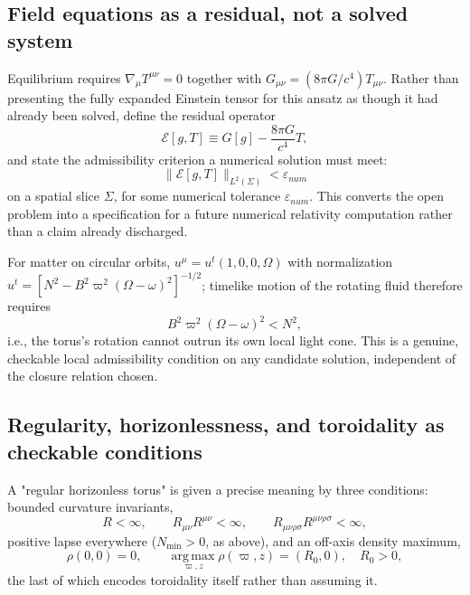 \documentclass[11pt]{article}
\begin{document}
\subsection{Field equations as a residual, not a solved system}

Equilibrium requires $\nabla_\mu T^{\mu\nu}=0$ together with $G_{\mu\nu} = (8\pi G/c^4)T_{\mu\nu}$. Rather than presenting the fully expanded Einstein tensor for this ansatz as though it had already been solved, define the residual operator
\begin{equation}
\mathcal{E}[g,T] \equiv G[g] - \frac{8\pi G}{c^4}T,
\end{equation}
and state the admissibility criterion a numerical solution must meet:
\begin{equation}
\|\mathcal{E}[g,T]\|_{L^2(\Sigma)} < \varepsilon_{num}
\end{equation}
on a spatial slice $\Sigma$, for some numerical tolerance $\varepsilon_{num}$. This converts the open problem into a specification for a future numerical relativity computation rather than a claim already discharged.

For matter on circular orbits, $u^\mu = u^t(1,0,0,\Omega)$ with normalization $u^t = \left[N^2 - B^2\varpi^2(\Omega-\omega)^2\right]^{-1/2}$; timelike motion of the rotating fluid therefore requires
\begin{equation}
B^2\varpi^2(\Omega-\omega)^2 < N^2,
\end{equation}
i.e., the torus's rotation cannot outrun its own local light cone. This is a genuine, checkable local admissibility condition on any candidate solution, independent of the closure relation chosen.

\subsection{Regularity, horizonlessness, and toroidality as checkable conditions}

A "regular horizonless torus" is given a precise meaning by three conditions: bounded curvature invariants,
\begin{equation}
R<\infty, \qquad R_{\mu\nu}R^{\mu\nu}<\infty, \qquad R_{\mu\nu\rho\sigma}R^{\mu\nu\rho\sigma}<\infty,
\end{equation}
positive lapse everywhere ($N_{\min}>0$, as above), and an off-axis density maximum,
\begin{equation}
\rho(0,0)=0, \qquad \operatorname*{arg\,max}_{\varpi,z}\rho(\varpi,z) = (R_0,0), \quad R_0>0,
\end{equation}
the last of which encodes toroidality itself rather than assuming it.
\end{document}
